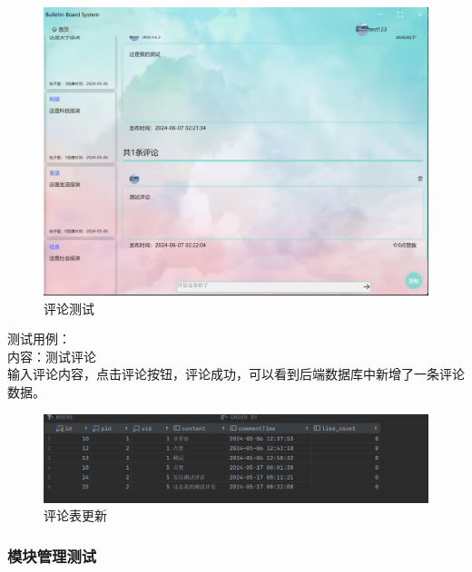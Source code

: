 \documentclass[UTF8]{ctexart}
\begin{document}
\begin{figure}[H]
  \centering
  \includegraphics[scale=0.3]{测试/评论成功.png}
  \caption{评论测试}
\end{figure}

测试用例：\\
内容：测试评论\\

输入评论内容，点击评论按钮，评论成功，可以看到后端数据库中新增了一条评论数据。

\begin{figure}[H]
  \centering
  \includegraphics[scale=0.3]{测试/评论表更新.png}
  \caption{评论表更新}
\end{figure}

\subsubsection{模块管理测试}
\end{document}
